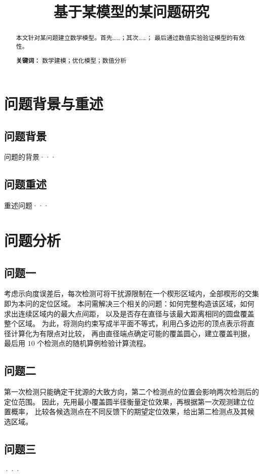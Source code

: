 \documentclass[UTF8,a4paper,12pt]{ctexart}
\title{\textbf{基于某模型的某问题研究}}
\begin{document}
\maketitle

\begin{abstract}
本文针对某问题建立数学模型。首先……；其次……；
最后通过数值实验验证模型的有效性。

\textbf{关键词：} 数学建模；优化模型；数值分析
\end{abstract}


\newpage

\section{问题背景与重述}
\subsection{问题背景}
问题的背景···
\subsection{问题重述}
重述问题···


\section{问题分析}
\subsection{问题一}



考虑示向度误差后，每次检测可将干扰源限制在一个楔形区域内，全部楔形的交集即为本问的定位区域。
本问需解决三个相关的问题：如何完整构造该区域，如何求出连续区域内的最大点间距，
以及是否存在直径与该最大距离相同的圆盘覆盖整个区域。
为此，将测向约束写成半平面不等式，利用凸多边形的顶点表示将直径计算化为有限点对比较，
再由直径端点确定可能的覆盖圆心，建立覆盖判据，最后用 $10$ 个检测点的随机算例检验计算流程。


\subsection{问题二}
第一次检测只能确定干扰源的大致方向，第二个检测点的位置会影响两次检测后的定位范围。
因此，先用最小覆盖圆半径衡量定位效果，再根据第一次观测建立位置概率，
比较各候选测点在不同反馈下的期望定位效果，给出第二检测点及其候选区域。
\subsection{问题三}
···
\end{document}
